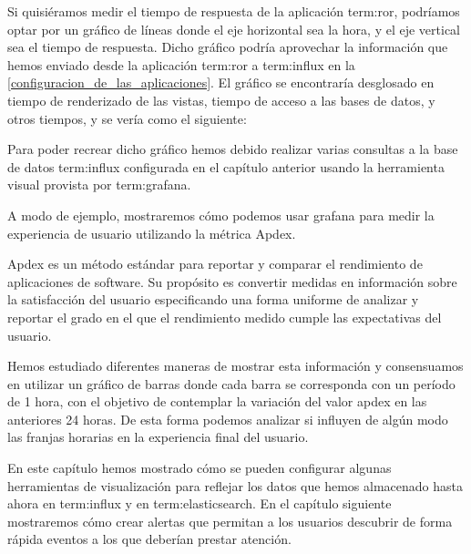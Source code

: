 Si quisiéramos medir el tiempo de respuesta de la aplicación \gls{term:ror},
podríamos optar por un gráfico de líneas donde el eje horizontal sea la hora, y
el eje vertical sea el tiempo de respuesta. Dicho gráfico podría aprovechar la
información que hemos enviado desde la aplicación \gls{term:ror} a
\gls{term:influx} en la \autoref{configuracion_de_las_aplicaciones}. El gráfico
se encontraría desglosado en tiempo de renderizado de las vistas, tiempo de
acceso a las bases de datos, y otros tiempos, y se vería como el siguiente:

Para poder recrear dicho gráfico hemos debido realizar varias consultas a la
base de datos \gls{term:influx} configurada en el capítulo anterior usando la
herramienta visual provista por \gls{term:grafana}.

A modo de ejemplo, mostraremos cómo podemos usar grafana para medir la
experiencia de usuario utilizando la métrica Apdex.

Apdex es un método estándar para reportar y comparar el rendimiento de
aplicaciones de software. Su propósito es convertir medidas en información
sobre la satisfacción del usuario especificando una forma uniforme de analizar
y reportar el grado en el que el rendimiento medido cumple las expectativas del
usuario.

Hemos estudiado diferentes maneras de mostrar esta información y consensuamos
en utilizar un gráfico de barras donde cada barra se corresponda con un período
de 1 hora, con el objetivo de contemplar la variación del valor apdex en las
anteriores 24 horas. De esta forma podemos analizar si influyen de algún modo
las franjas horarias en la experiencia final del usuario.

En este capítulo hemos mostrado cómo se pueden configurar algunas herramientas
de visualización para reflejar los datos que hemos almacenado hasta ahora en
\gls{term:influx} y en \gls{term:elasticsearch}. En el capítulo siguiente
mostraremos cómo crear alertas que permitan a los usuarios descubrir de forma
rápida eventos a los que deberían prestar atención.

